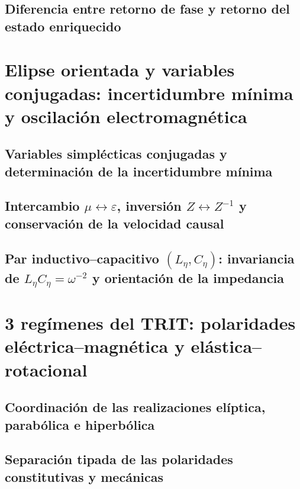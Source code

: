 \subsection{Diferencia entre retorno de fase y retorno del estado enriquecido}


\section{Elipse orientada y variables conjugadas: incertidumbre mínima y oscilación electromagnética}
\subsection{Variables simplécticas conjugadas y determinación de la incertidumbre mínima}

\subsection{Intercambio \(\mu\leftrightarrow\varepsilon\), inversión \(Z\leftrightarrow Z^{-1}\) y conservación de la velocidad causal}

\subsection{Par inductivo--capacitivo \((L_\eta,C_\eta)\): invariancia de \(L_\eta C_\eta=\omega^{-2}\) y orientación de la impedancia}


\section{3 regímenes del TRIT: polaridades eléctrica--magnética y elástica--rotacional}
\subsection{Coordinación de las realizaciones elíptica, parabólica e hiperbólica}

\subsection{Separación tipada de las polaridades constitutivas y mecánicas}


